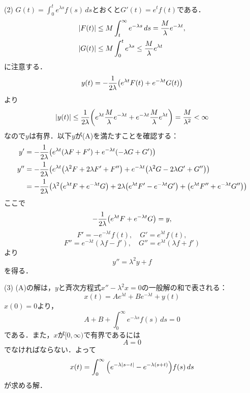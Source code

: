 \documentclass[a4j]{ltjsarticle}
\newcommand{\1}{\mathbbm{1}}
\numberwithin{equation}{section}
\theoremstyle{definition}
\begin{document}
(2) $G(t)=\int_0^t e^{\lambda s}f(s)\,ds$とおくと$G'(t)=e^tf(t)$である．
\begin{align}
    \abs{F(t)}&\leq M\int_{t}^\infty e^{-\lambda s}\,ds=\frac{M}{\lambda}e^{-\lambda t},\\
    \abs{G(t)}&\leq M\int_{0}^{t}e^{\lambda s}\leq \frac{M}{\lambda}e^{\lambda t} 
\end{align}
に注意する．
\begin{equation}
    y(t)=-\frac{1}{2\lambda}\qty(e^{\lambda t}F(t)+e^{-\lambda t}G(t))
\end{equation}
より
\begin{equation}
    \abs{y(t)}\leq \frac{1}{2\lambda}\qty(e^{\lambda t}\frac{M}{\lambda}e^{-\lambda t}+e^{-\lambda t}\frac{M}{\lambda}e^{\lambda t})=\frac{M}{\lambda^2} <\infty 
\end{equation}
なので$y$は有界．以下$y$が(A)を満たすことを確認する：
\begin{align}
    y'&=-\frac{1}{2\lambda}\qty(e^{\lambda t}(\lambda F+F')+e^{-\lambda t}(-\lambda G+G'))\\
    y''&=-\frac{1}{2\lambda}\qty(e^{\lambda t}\qty(\lambda^2F+2\lambda F'+F'')+e^{-\lambda t}\qty(\lambda^2G-2\lambda G'+G''))\\
    &=-\frac{1}{2\lambda}\qty(\lambda^2\qty(e^{\lambda t}F+e^{-\lambda t}G)+2\lambda\qty(e^{\lambda t}F'-e^{-\lambda t}G')+\qty(e^{\lambda t}F''+e^{-\lambda t}G''))
\end{align}
ここで
\begin{equation}
    -\frac{1}{2\lambda}\qty(e^{\lambda t}F+e^{-\lambda t}G)=y,
\end{equation}
\begin{equation}
    F'=-e^{-\lambda t}f(t),\quad G'=e^{\lambda t}f(t),
\end{equation}
\begin{equation}
    F''=e^{-\lambda t}(\lambda f-f'),\quad G''=e^{\lambda t}(\lambda f+f')
\end{equation}
より
\begin{equation}
    y''=\lambda^2 y+f 
\end{equation}
を得る．

(3) (A)の解は，$y$と斉次方程式$x''-\lambda^2x=0$の一般解の和で表される：
\begin{equation}
    x(t)=Ae^{\lambda t}+Be^{-\lambda t}+y(t)
\end{equation}
$x(0)=0$より，
\begin{equation}
    A+B+\int_{0}^\infty e^{-\lambda s}f(s)\,ds=0 
\end{equation}
である．また，$x$が$[0,\infty)$で有界であるには
\begin{equation}
    A=0
\end{equation}
でなければならない．よって
\begin{equation}
    x(t)=\int_{0}^\infty \qty(e^{-\lambda\abs{s-t}}-e^{-\lambda(s+t)})f(s)\,ds
\end{equation}
が求める解．
\end{document}
